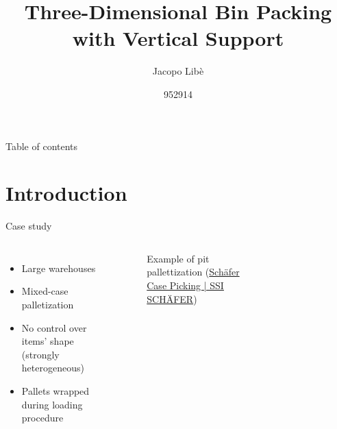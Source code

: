 \documentclass{beamer}
\title{Three-Dimensional Bin Packing \\ with Vertical Support}
\subtitle{}
\author{Jacopo Libè}
\date{952914}
\begin{document}
    \begin{frame}
        \maketitle
    \end{frame}
    
    \begin{frame}{Table of contents}
      \tableofcontents
    \end{frame}
    
    \section{Introduction}
    \begin{frame}{Case study}
        \begin{columns}[onlytextwidth,T]
            \column{\dimexpr\linewidth-55mm-5mm}
                \begin{itemize}
                    \item Large warehouses
                    \item Mixed-case palletization
                    \item No control over items' shape (strongly heterogeneous)
                    \item Pallets wrapped during loading procedure
                \end{itemize}
                \vspace{-5mm}
                \begin{figure}[H]
                    \caption{Example of pit pallettization (\hyperlink{https://www.youtube.com/watch?v=_sSdk1baNLA}{Schäfer Case Picking | SSI SCHÄFER})}
                \end{figure}
            \column{55mm}
                \begin{figure}

\end{figure}
\end{columns}
\end{frame}
\end{document}

